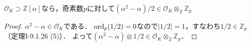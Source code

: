 %
%

\begin{screen}
  $\mathcal{O}_K\supset\mathbb{Z}[\alpha]$なら，奇素数$p$に対して$(\alpha^2-\alpha)/2\in\mathcal{O}_K\otimes_\mathbb{Z}\mathbb{Z}_p$
\end{screen}
\begin{proof}
  $\alpha^2-\alpha\in\mathcal{O}_K$である．
  $\operatorname{ord}_p(1/2)=0$なので$\lvert1/2\rvert=1$，すなわち$1/2\in\mathbb{Z}_p$（定理I-9.1.26 (5)）．
  よって$(\alpha^2-\alpha) \otimes 1/2\in\mathcal{O}_K\otimes_\mathbb{Z}\mathbb{Z}_p$．
\end{proof}

